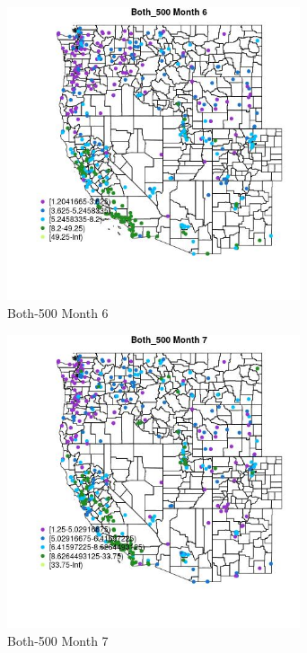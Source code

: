 \begin{figure} 
\centering  
\includegraphics[width=0.77\textwidth]{Code_Outputs/ML_input_report_ML_input_PM25_Step5_part_d_de_duplicated_aves_ML_input_MapObsMo6Both_500.jpg} 
\caption{\label{fig:ML_input_report_ML_input_PM25_Step5_part_d_de_duplicated_aves_ML_inputMapObsMo6Both_500}Both-500 Month 6} 
\end{figure} 
 

\begin{figure} 
\centering  
\includegraphics[width=0.77\textwidth]{Code_Outputs/ML_input_report_ML_input_PM25_Step5_part_d_de_duplicated_aves_ML_input_MapObsMo7Both_500.jpg} 
\caption{\label{fig:ML_input_report_ML_input_PM25_Step5_part_d_de_duplicated_aves_ML_inputMapObsMo7Both_500}Both-500 Month 7} 
\end{figure} 
 

